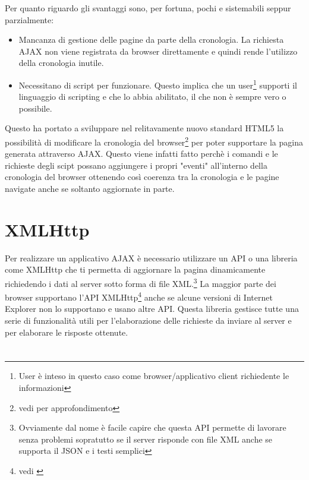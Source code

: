 \documentclass[a4paper,12pt]{report}
\begin{document}
Per quanto riguardo gli svantaggi sono, per fortuna, pochi e sistemabili seppur parzialmente:
\begin{itemize}
\item Mancanza di gestione delle pagine da parte della cronologia. La richiesta AJAX non viene registrata da browser direttamente e quindi rende l'utilizzo della cronologia inutile.
\item Necessitano di script per funzionare. Questo implica che un user\footnote{User è inteso in questo caso come browser/applicativo client richiedente le informazioni} supporti il linguaggio di scripting e che lo abbia abilitato, il che non è sempre vero o possibile.
\end{itemize}

Questo ha portato a sviluppare nel relitavamente nuovo standard HTML5 la possibilità di modificare la cronologia del browser\footnote{vedi \cites{site:w3chtml5} per approfondimento} per poter supportare la pagina generata attraverso AJAX. Questo viene infatti fatto perchè i comandi e le richieste degli scipt possano aggiungere i propri "eventi" all'interno della cronologia del browser ottenendo così coerenza tra la cronologia e le pagine navigate anche se soltanto aggiornate in parte.

\section{XMLHttp} Per realizzare un applicativo AJAX è necessario utilizzare un API o una libreria come XMLHttp che ti permetta di aggiornare la pagina dinamicamente richiedendo i dati al server sotto forma di file XML.\footnote{Ovviamente dal nome è facile capire che questa API permette di lavorare senza problemi sopratutto se il server risponde con file XML anche se supporta il JSON e i testi semplici} 
La maggior parte dei browser supportano l'API XMLHttp\footnote{vedi \textcites{site:xmlhttpcompatibilita}} anche se alcune versioni di Internet Explorer non lo supportano e usano altre API.
Questa libreria gestisce tutte una serie di funzionalità utili per l'elaborazione delle richieste da inviare al server e per elaborare le risposte ottenute.


\newpage
\section*{\refname}
\printbibliography[heading=web, nottype=book]
\printbibliography[heading=libri, type=book]
\end{document}
